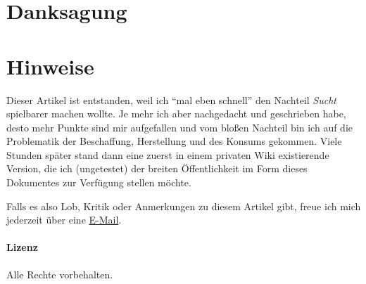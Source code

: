 \clearpage
{}
{}
\printbibliography[title = {Quellen}]
\clearpage

\section{Danksagung}


\section{Hinweise}
Dieser Artikel ist entstanden, weil ich \enquote{mal eben schnell} den Nachteil \emph{Sucht} spielbarer machen wollte. Je mehr ich aber nachgedacht und geschrieben habe, desto mehr Punkte sind mir aufgefallen und vom bloßen Nachteil bin ich auf die Problematik der Beschaffung, Herstellung und des Konsums gekommen. Viele Stunden später stand dann eine zuerst in einem privaten Wiki existierende Version, die ich (ungetestet) der breiten Öffentlichkeit im Form dieses Dokumentes zur Verfügung stellen möchte.

Falls es also Lob, Kritik oder Anmerkungen zu diesem Artikel gibt, freue ich mich jederzeit über eine \href{https://kreuvf.de/impressum.php}{E-Mail}.

\paragraph{Lizenz}
Alle Rechte vorbehalten.


